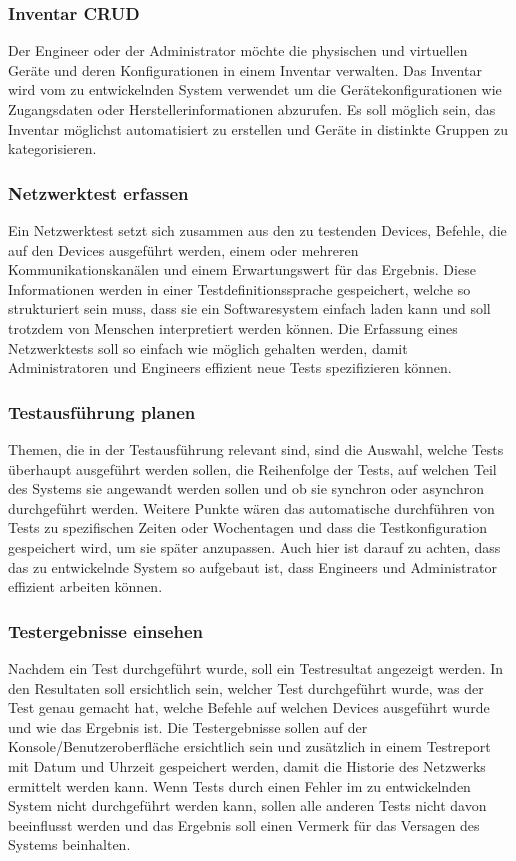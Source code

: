 \documentclass[
	ngerman,
	toc=listof, %
	toc=bibliography, %
	footnotes=multiple, %
	parskip=half, %
	numbers=noendperiod %
]{scrartcl}
\begin{document}
		\subsubsection{Inventar CRUD}
			Der Engineer oder der Administrator möchte die physischen und virtuellen Geräte und deren Konfigurationen in einem Inventar verwalten.
			Das Inventar wird vom zu entwickelnden System verwendet um die Gerätekonfigurationen wie Zugangsdaten oder Herstellerinformationen abzurufen.
			Es soll möglich sein, das Inventar möglichst automatisiert zu erstellen und Geräte in distinkte Gruppen zu kategorisieren.

		\subsubsection{Netzwerktest erfassen}
			Ein Netzwerktest setzt sich zusammen aus den zu testenden Devices, Befehle, die auf den Devices ausgeführt werden, einem oder mehreren Kommunikationskanälen und einem Erwartungswert für das Ergebnis.
			Diese Informationen werden in einer Testdefinitionssprache gespeichert, welche so strukturiert sein muss, dass sie ein Softwaresystem einfach laden kann und soll trotzdem von Menschen interpretiert werden können.
			Die Erfassung eines Netzwerktests soll so einfach wie möglich gehalten werden, damit Administratoren und Engineers effizient neue Tests spezifizieren können.

		\subsubsection{Testausführung planen}
			Themen, die in der Testausführung relevant sind, sind die Auswahl, welche Tests überhaupt ausgeführt werden sollen, die Reihenfolge der Tests, auf welchen Teil des Systems sie angewandt werden sollen und ob sie synchron oder asynchron durchgeführt werden.
			Weitere Punkte wären das automatische durchführen von Tests zu spezifischen Zeiten oder Wochentagen und dass die Testkonfiguration gespeichert wird, um sie später anzupassen.
			Auch hier ist darauf zu achten, dass das zu entwickelnde System so aufgebaut ist, dass Engineers und Administrator effizient arbeiten können.

		\subsubsection{Testergebnisse einsehen}
			Nachdem ein Test durchgeführt wurde, soll ein Testresultat angezeigt werden.
			In den Resultaten soll ersichtlich sein, welcher Test durchgeführt wurde, was der Test genau gemacht hat, welche Befehle auf welchen Devices ausgeführt wurde und wie das Ergebnis ist.
			Die Testergebnisse sollen auf der Konsole/Benutzeroberfläche ersichtlich sein und zusätzlich in einem Testreport mit Datum und Uhrzeit gespeichert werden, damit die Historie des Netzwerks ermittelt werden kann.
			Wenn Tests durch einen Fehler im zu entwickelnden System nicht durchgeführt werden kann, sollen alle anderen Tests nicht davon beeinflusst werden und das Ergebnis soll einen Vermerk für das Versagen des Systems beinhalten.
	
\end{document}
